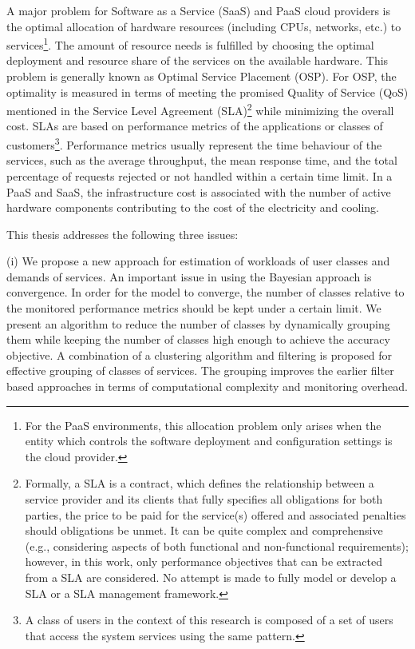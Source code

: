 A major problem for Software as a Service (SaaS) and PaaS cloud providers is the optimal allocation of hardware resources (including CPUs, networks, etc.) to services\footnote{For the PaaS environments, this allocation problem only arises when the entity which controls the software deployment and configuration settings is the cloud provider.}. The amount of resource needs is fulfilled by choosing the optimal deployment and resource share of the services on the available hardware. This problem is generally known as Optimal Service Placement (OSP)\cite{zhang2012dynamicPlacement}. 
   For OSP, the optimality is measured in terms of meeting the promised Quality of Service (QoS) mentioned in the Service Level Agreement (SLA)\footnote{Formally, a SLA is a contract, which defines the relationship between a service provider and its clients that fully specifies all obligations for both parties, the price to be paid for the service(s) offered and associated penalties should obligations be unmet. It can be quite complex and comprehensive (e.g., considering aspects of both functional and non-functional requirements); however, in this work, only performance objectives that can be extracted from a SLA are considered. No attempt is made to fully model or develop a SLA or a SLA management framework.} while minimizing the overall cost. SLAs are based on performance metrics of the applications or classes of customers\footnote{A class of users in the context of this research is composed of a set of users that access the system services using the same pattern.}.
	Performance metrics usually represent the time behaviour of the services, such as the average throughput, the mean response time, and the total percentage of requests rejected or not handled within a certain time limit. 
	In a PaaS and SaaS, the infrastructure cost is associated with the number of active hardware components contributing to the cost of the electricity and cooling. 

 This thesis addresses the following three issues:   
  
 (i) We propose a new approach for estimation of workloads of user classes and demands of services. An important issue in using the Bayesian approach is convergence.  In order for the model to converge, the number of classes relative to the monitored performance metrics should be kept under a certain limit. We present an algorithm to reduce the number of classes by dynamically grouping them while keeping the number of classes high enough to achieve the accuracy objective. A combination of a clustering algorithm and filtering is proposed for effective grouping of classes of services. The grouping improves the earlier filter based approaches in terms of computational complexity and monitoring overhead. %
       
